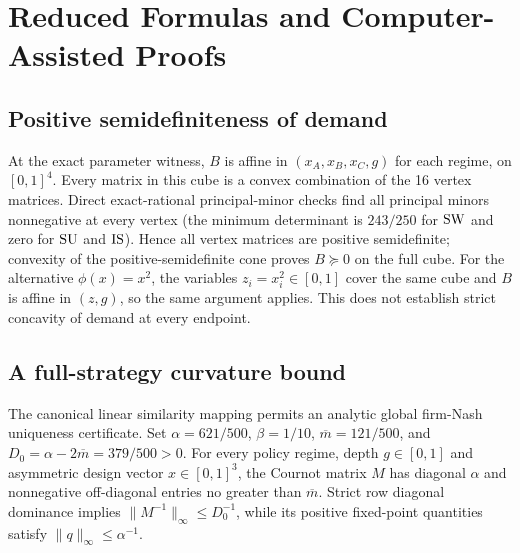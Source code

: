 \section{Reduced Formulas and Computer-Assisted Proofs}\label{app:proofs}


\subsection{Positive semidefiniteness of demand}\label{app:utility-psd}
At the exact parameter witness, $B$ is affine in
$(x_A,x_B,x_C,g)$ for each regime, on $[0,1]^4$.
Every matrix in this cube is a convex combination
of the 16 vertex matrices. Direct exact-rational
principal-minor checks find all principal minors
nonnegative at every vertex (the minimum determinant
is $243/250$ for $\mathrm{SW}$ and zero for $\mathrm{SU}$ and $\mathrm{IS}$).
Hence all vertex matrices are positive semidefinite;
convexity of the positive-semidefinite cone proves
$B\succeq 0$ on the full cube. For the alternative
$\phi(x)=x^2$, the variables $z_i=x_i^2\in[0,1]$
cover the same cube and $B$ is affine in $(z,g)$,
so the same argument applies. This does not
establish strict concavity of demand at every endpoint.
\subsection{A full-strategy curvature bound}\label{app:rosen-bound}

The canonical linear similarity mapping permits an analytic
global firm-Nash uniqueness certificate.
Set $\alpha=621/500$, $\beta=1/10$,
$\overline m=121/500$, and
$D_0=\alpha-2\overline m=379/500>0$.
For every policy regime, depth $g\in[0,1]$ and
asymmetric design vector $x\in[0,1]^3$,
the Cournot matrix $M$ has diagonal $\alpha$
and nonnegative off-diagonal entries no greater
than $\overline m$. Strict row diagonal dominance
implies $\|M^{-1}\|_\infty\leq D_0^{-1}$,
while its positive fixed-point quantities satisfy
$\|q\|_\infty\leq\alpha^{-1}$.

